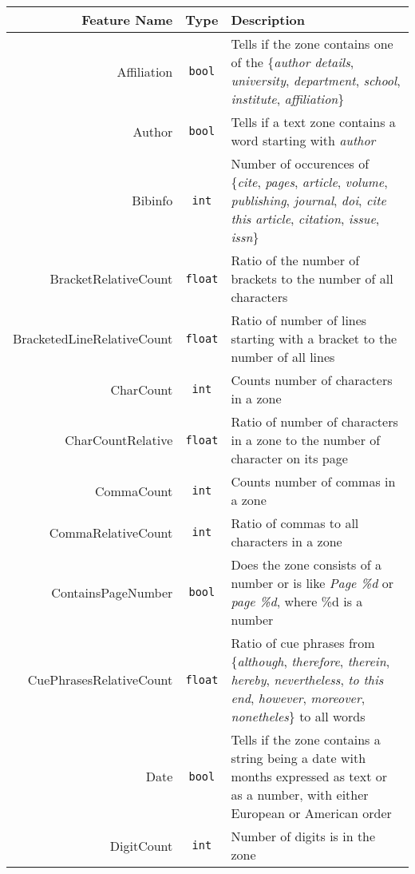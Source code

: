 \begin{appendix}
\small
\setlength\LTleft{-2cm}
\begin{longtable}[c]{|r|c|p{8cm}|}
\hline
\textbf{Feature Name} & \textbf{Type} & \textbf{Description} \\ \hline
Affiliation & \verb+bool+ & Tells if the zone contains one of the \{\textit{author details}, \textit{university}, \textit{department}, \textit{school}, \textit{institute}, \textit{affiliation}\}\\ \hline
Author & \verb+bool+ & Tells if a text zone contains a word starting with \textit{author}\\ \hline
Bibinfo & \verb+int+ & Number of occurences of \{\textit{cite}, \textit{pages}, \textit{article}, \textit{volume}, \textit{publishing}, \textit{journal}, \textit{doi}, \textit{cite this article}, \textit{citation}, \textit{issue}, \textit{issn}\} \\ \hline
BracketRelativeCount & \verb+float+ & Ratio of the number of brackets to the number of all characters \\ \hline
BracketedLineRelativeCount & \verb+float+ & Ratio of number of lines starting with a bracket to the number of all lines\\ \hline
CharCount & \verb+int+ & Counts number of characters in a zone\\ \hline
CharCountRelative & \verb+float+ & Ratio of number of characters in a zone to the number of character on its page\\ \hline
CommaCount & \verb+int+ & Counts number of commas in a zone\\ \hline
CommaRelativeCount & \verb+int+ & Ratio of commas to all characters in a zone \\ \hline
ContainsPageNumber & \verb+bool+  & Does the zone consists of a number or is like \textit{Page \%d} or \textit{page \%d}, where \%d is a number \\ \hline
CuePhrasesRelativeCount & \verb+float+ & Ratio of cue phrases from \{\textit{although}, \textit{therefore}, \textit{therein}, \textit{hereby}, \textit{nevertheless}, \textit{to this end}, \textit{however}, \textit{moreover}, \textit{nonetheles}\} to all words\\ \hline
Date & \verb+bool+ & Tells if the zone contains a string being a date with months expressed as text or as a number, with either European or American order\\ \hline
DigitCount & \verb+int+ & Number of digits is in the zone\\ \hline

\end{longtable}
\end{appendix}
